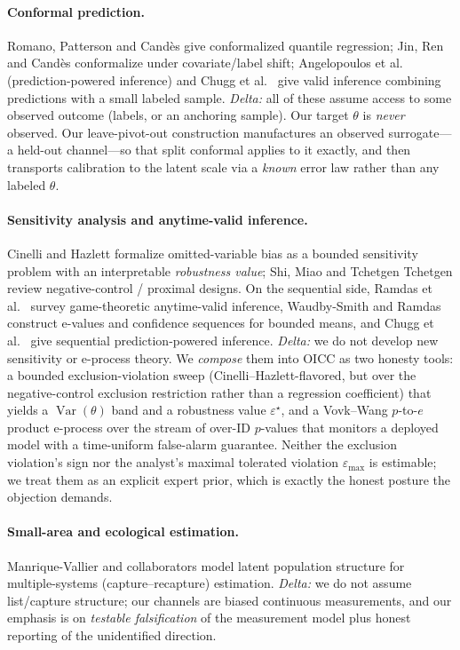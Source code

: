 \documentclass[11pt]{article}
\theoremstyle{definition}
\theoremstyle{remark}
\newcommand{\Var}{\operatorname{Var}}
\newcommand{\eps}{\varepsilon}
\begin{document}
\paragraph{Conformal prediction.}
Romano, Patterson and Cand\`es \cite{romano2019cqr} give conformalized
quantile regression; Jin, Ren and Cand\`es \cite{jin2023} conformalize under
covariate/label shift; Angelopoulos et al.\ \cite{ppi} (prediction-powered
inference) and Chugg et al.\ \cite{chugg2023} give valid inference combining
predictions with a small labeled sample. \emph{Delta:} all of these assume
access to some observed outcome (labels, or an anchoring sample). Our target
$\theta$ is \emph{never} observed. Our leave-pivot-out construction manufactures
an observed surrogate---a held-out channel---so that split conformal applies
to it exactly, and then transports calibration to the latent scale via a
\emph{known} error law rather than any labeled $\theta$.

\paragraph{Sensitivity analysis and anytime-valid inference.}
Cinelli and Hazlett \cite{cinelli2020} formalize omitted-variable bias as a
bounded sensitivity problem with an interpretable \emph{robustness value};
Shi, Miao and Tchetgen Tchetgen \cite{shi2020} review negative-control /
proximal designs. On the sequential side, Ramdas et al.\ \cite{ramdas2023}
survey game-theoretic anytime-valid inference, Waudby-Smith and Ramdas
\cite{wsr2024} construct e-values and confidence sequences for bounded means,
and Chugg et al.\ \cite{chugg2023} give sequential prediction-powered
inference. \emph{Delta:} we do not develop new sensitivity or e-process
theory. We \emph{compose} them into OICC as two honesty tools: a bounded
exclusion-violation sweep (Cinelli--Hazlett-flavored, but over the
negative-control exclusion restriction rather than a regression coefficient)
that yields a $\Var(\theta)$ band and a robustness value $\eps^\star$, and a
Vovk--Wang $p$-to-$e$ product e-process over the stream of over-ID $p$-values
that monitors a deployed model with a time-uniform false-alarm guarantee.
Neither the exclusion violation's sign nor the analyst's maximal tolerated
violation $\eps_{\max}$ is estimable; we treat them as an explicit expert
prior, which is exactly the honest posture the objection demands.

\paragraph{Small-area and ecological estimation.}
Manrique-Vallier and collaborators \cite{manriquevallier} model latent
population structure for multiple-systems (capture--recapture) estimation.
\emph{Delta:} we do not assume list/capture structure; our channels are
biased continuous measurements, and our emphasis is on \emph{testable
falsification} of the measurement model plus honest reporting of the
unidentified direction.
\end{document}
